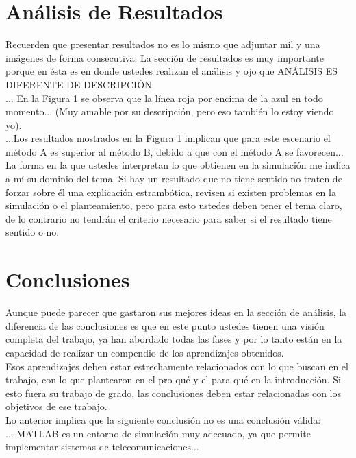 \documentclass[12pt]{article}
\begin{document}
\section*{Análisis de Resultados}
    Recuerden que presentar resultados no es lo mismo que adjuntar mil y una imágenes de 
    forma consecutiva. La sección de resultados es muy importante porque en ésta es en 
    donde ustedes realizan el análisis y ojo que ANÁLISIS ES DIFERENTE DE DESCRIPCIÓN.\\
    ... En la Figura 1 se observa que la línea roja por encima de la azul en todo 
    momento... (Muy amable por su descripción, pero eso también lo estoy viendo yo).\\
    ...Los resultados mostrados en la Figura 1 implican que para este escenario el método A 
    es superior al método B, debido a que con el método A se favorecen...\\
    La forma en la que ustedes interpretan lo que obtienen en la simulación me indica a mí su 
    dominio del tema. Si hay un resultado que no tiene sentido no traten de forzar sobre él 
    una explicación estrambótica, revisen si existen problemas en la simulación o el 
    planteamiento, pero para esto ustedes deben tener el tema claro, de lo contrario no 
    tendrán el criterio necesario para saber si el resultado tiene sentido o no.
    
\section*{Conclusiones}
    Aunque puede parecer que gastaron sus mejores ideas en la sección de análisis, la 
    diferencia de las conclusiones es que en este punto ustedes tienen una visión completa 
    del trabajo, ya han abordado todas las fases y por lo tanto están en la capacidad de 
    realizar un compendio de los aprendizajes obtenidos.\\
    Esos aprendizajes deben estar estrechamente relacionados con lo que buscan en el 
    trabajo, con lo que plantearon en el pro qué y el para qué en la introducción. Si esto fuera 
    su trabajo de grado, las conclusiones deben estar relacionadas con los objetivos de ese 
    trabajo.\\
    Lo anterior implica que la siguiente conclusión no es una conclusión válida:\\
    ... MATLAB es un entorno de simulación muy adecuado, ya que permite implementar 
    sistemas de telecomunicaciones...
\end{document}
